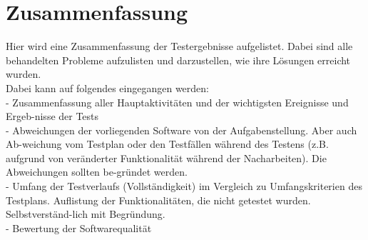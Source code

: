 

\chapter{Zusammenfassung}
Hier wird eine Zusammenfassung der Testergebnisse aufgelistet. Dabei sind alle
behandelten Probleme aufzulisten und darzustellen, wie ihre Lösungen erreicht
wurden.\\
Dabei kann auf folgendes eingegangen werden:\\
-  Zusammenfassung aller Hauptaktivitäten und der wichtigsten Ereignisse und
   Ergeb-nisse der Tests \\
-  Abweichungen der vorliegenden Software von der Aufgabenstellung. Aber auch
   Ab-weichung vom Testplan oder den Testfällen während des Testens (z.B.
   aufgrund von veränderter Funktionalität während der Nacharbeiten). Die
   Abweichungen sollten be-gründet werden.\\
-  Umfang der Testverlaufs (Vollständigkeit) im Vergleich zu Umfangskriterien
   des Testplans. Auflistung der Funktionalitäten, die nicht getestet wurden.
   Selbstverständ-lich mit Begründung.\\
-  Bewertung der Softwarequalität
